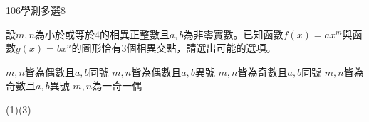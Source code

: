 \begin{QUESTIONS}
    \begin{QUESTION}
        \begin{ExamInfo}{106}{學測}{多選}{8}
        \end{ExamInfo}
        \begin{ExamAnsRateInfo}{24}{35}{20}{17}
        \end{ExamAnsRateInfo}
        \begin{QBODY}
            設$m,n$為小於或等於$4$的相異正整數且$a,b$為非零實數。已知函數$f(x)=a{{x}^{m}}$與函數$g(x)=b{{x}^{n}}$的圖形恰有$3$個相異交點，請選出可能的選項。
			\begin{QOPS}
			\QOP $m,n$皆為偶數且$a,b$同號 
			\QOP $m,n$皆為偶數且$a,b$異號
			\QOP $m,n$皆為奇數且$a,b$同號
			\QOP $m,n$皆為奇數且$a,b$異號
			\QOP $m,n$為一奇一偶
			\end{QOPS}
        \end{QBODY}
        \begin{QFROMS}
        \end{QFROMS}
        \begin{QTAGS}\end{QTAGS}
        \begin{QANS}
            (1)(3)
        \end{QANS}
        \begin{QSOLLIST}
            \begin{QSOL}
            \end{QSOL}
            \begin{QSOL}
                \begin{QSTEPS}
\end{QSTEPS}
\end{QSOL}
\end{QSOLLIST}
\end{QUESTION}
\end{QUESTIONS}

